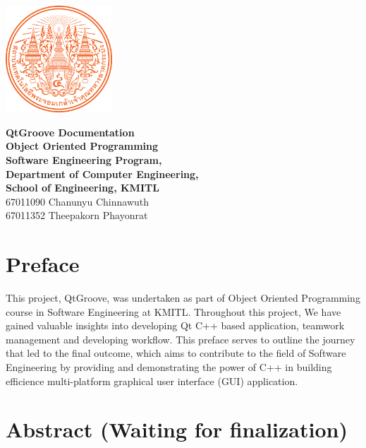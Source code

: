 \documentclass[12pt]{report} %
\begin{document}
\begin{titlepage}
	\centering
	\vspace*{1cm} %
	\includegraphics[width=0.3\textwidth]{images/KMITL Logo.png} %

	\vspace{1cm} %
	{\LARGE \textbf{QtGroove Documentation}} \\[0.5cm] %
	\vspace{0.5cm}
	{\large \textbf{Object Oriented Programming}} \\[0.5cm]
	{\large \textbf{Software Engineering Program,}} \\[0.5cm]
	{\large \textbf{Department of Computer Engineering,}} \\[0.5cm]
	{\large \textbf{School of Engineering, KMITL}} \\[1cm]
	{\Large 67011090 Chanunyu Chinnawuth \\ 67011352 Theepakorn Phayonrat} \\[0.5cm] %
\end{titlepage}

\chapter*{Preface}
\hspace{1cm}This project, QtGroove, was undertaken as part of Object Oriented Programming course in
Software Engineering at KMITL. Throughout this project, We have gained valuable insights into developing
Qt C++ based application, teamwork management and developing workflow. This preface serves to outline
the journey that led to the final outcome, which aims to contribute to the field of Software Engineering
by providing and demonstrating the power of C++ in building efficience multi-platform graphical user interface
(GUI) application.
\newpage

\chapter*{Abstract (Waiting for finalization)}
\end{document}

